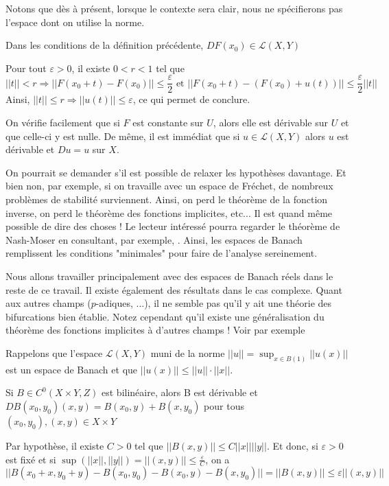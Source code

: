\documentclass[memoire.tex]{subfiles}
\begin{document}
Notons que dès à présent, lorsque le contexte sera clair, nous ne spécifierons pas l'espace dont on utilise la norme. 
\begin{proposition}
    Dans les conditions de la définition précédente, $DF(x_0)\in \mathcal{L}(X,Y)$
\end{proposition}
\begin{preuve}
    Pour tout $\varepsilon>0$, il existe $0<r<1$ tel que
    \begin{equation*}
        ||t||<r\Rightarrow ||F(x_0+t) - F(x_0)||\leq 
        \frac{\varepsilon}{2}\text{ et } ||F(x_0+t)-(F(x_0)+u(t))||\leq\frac{\varepsilon}{2} ||t||
    \end{equation*}
Ainsi, $||t||\leq r\Rightarrow ||u(t)||\leq\varepsilon$, ce qui permet de conclure.
\end{preuve}
On vérifie facilement que si $F$ est constante sur $U$, alors elle est dérivable sur $U$ et que celle-ci y est nulle. De même, il est immédiat que si $u\in \mathcal{L}(X,Y)$ alors $u$ est dérivable et $Du=u$ sur $X$.
\begin{remarque}
On pourrait se demander s'il est possible de relaxer les hypothèses davantage. Et bien non, par exemple, si on travaille avec un espace de Fréchet, de nombreux problèmes de stabilité surviennent. Ainsi, on perd le théorème de la fonction inverse, on perd le théorème des fonctions implicites, etc... Il est quand même possible de dire des choses ! Le lecteur intéressé pourra regarder le théorème de Nash-Moser en consultant, par exemple, \cite{schwartz1960nash}. Ainsi, les espaces de Banach remplissent les conditions "minimales" pour faire de l'analyse sereinement.
\end{remarque}
\begin{remarque}
Nous allons travailler principalement avec des espaces de Banach réels dans le reste de ce travail. Il existe également des résultats dans le cas complexe. Quant aux autres champs ($p$-adiques, ...), il ne semble pas qu'il y ait une théorie des bifurcations  bien établie. Notez cependant qu'il existe une généralisation du théorème des fonctions implicites à d'autres champs ! Voir par exemple \cite{glockner2006implicit}
\end{remarque}
Rappelons que l'espace $\mathcal{L}(X,Y)$ muni de la norme $||u||=\sup_{x\in B(1)} ||u(x)||$  est un espace de Banach et que $|| u(x) ||\leq ||u||\cdot||x||$. 

\begin{proposition}
Si $B\in C^0(X\times Y,Z)$ est 
bilinéaire, alors B est dérivable et $DB(x_0,y_0)(x,y)= B(x_0,y)+B(x,y_0)$ 
pour tous $(x_0,y_0),(x,y)\in X\times Y$
\end{proposition}
\begin{preuve}
     Par hypothèse, il existe $C>0$ tel que $||B(x,y)||\leq  C||x|| ||y||$. Et donc, si $\varepsilon>0$ est fixé et si $\sup(||x||,||y||)=||(x,y)||\leq \frac{\varepsilon}{C}$, on a 
     \begin{equation*}
         || B(x_0+x,y_0+y)-B(x_0,y_0)-
         B(x_0,y)-B(x,y_0)||= ||B(x,y)||\leq\varepsilon ||(x,y)||
     \end{equation*}
\end{preuve}
\end{document}
